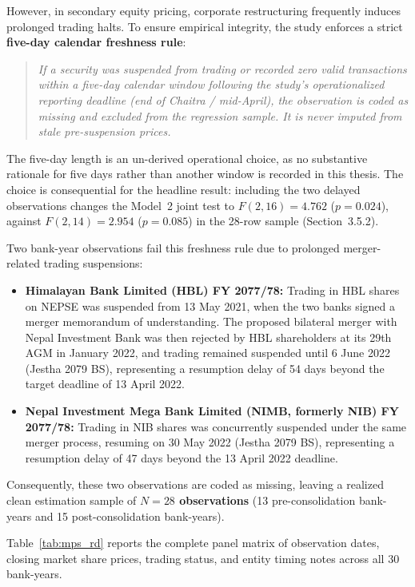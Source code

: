 However, in secondary equity pricing, corporate restructuring frequently induces prolonged trading halts. To ensure empirical integrity, the study enforces a strict \textbf{five-day calendar freshness rule}:
\begin{quote}
\textit{If a security was suspended from trading or recorded zero valid transactions within a five-day calendar window following the study's operationalized reporting deadline (end of Chaitra / mid-April), the observation is coded as missing and excluded from the regression sample. It is never imputed from stale pre-suspension prices.}
\end{quote}

The five-day length is an un-derived operational choice, as no substantive rationale for five days rather than another window is recorded in this thesis. The choice is consequential for the headline result: including the two delayed observations changes the Model~2 joint test to $F(2,16)=4.762$ ($p=0.024$), against $F(2,14)=2.954$ ($p=0.085$) in the 28-row sample (Section~3.5.2).

Two bank-year observations fail this freshness rule due to prolonged merger-related trading suspensions:
\begin{itemize}
    \item \textbf{Himalayan Bank Limited (HBL) FY 2077/78:} Trading in HBL shares on NEPSE was suspended from 13 May 2021, when the two banks signed a merger memorandum of understanding. The proposed bilateral merger with Nepal Investment Bank was then rejected by HBL shareholders at its 29th AGM in January 2022, and trading remained suspended until 6 June 2022 (Jestha 2079 BS), representing a resumption delay of 54 days beyond the target deadline of 13 April 2022.
    \item \textbf{Nepal Investment Mega Bank Limited (NIMB, formerly NIB) FY 2077/78:} Trading in NIB shares was concurrently suspended under the same merger process, resuming on 30 May 2022 (Jestha 2079 BS), representing a resumption delay of 47 days beyond the 13 April 2022 deadline.
\end{itemize}

Consequently, these two observations are coded as missing, leaving a realized clean estimation sample of \textbf{$N = 28$ observations} (13 pre-consolidation bank-years and 15 post-consolidation bank-years).

Table~\ref{tab:mps_rd} reports the complete panel matrix of observation dates, closing market share prices, trading status, and entity timing notes across all 30 bank-years.

